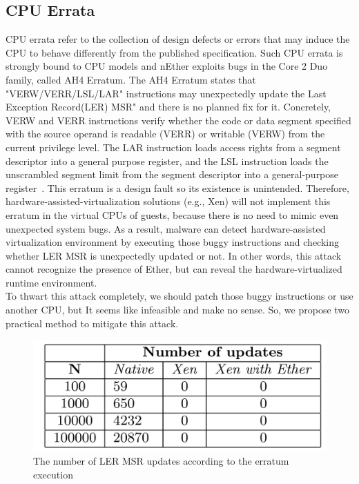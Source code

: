 \subsection{CPU Errata}
\label{sec:approach-errata}
CPU errata refer to the collection of design defects or errors that may induce the CPU to behave differently from the published specification. Such CPU errata is strongly bound to CPU models and nEther exploits bugs in the Core 2 Duo family, called AH4 Erratum. The AH4 Erratum states that "VERW/VERR/LSL/LAR" instructions may unexpectedly update the Last Exception Record(LER) MSR" and there is no planned fix for it. Concretely, VERW and VERR instructions verify whether the code or data segment specified with the source operand is readable (VERR) or writable (VERW) from the current privilege level. The LAR instruction loads access rights from a segment descriptor into a general purpose register, and the LSL instruction loads the unscrambled segment limit from the segment descriptor into a general-purpose register~\cite{intelsys}. This erratum is a design fault so its existence is unintended. Therefore, hardware-assisted-virtualization solutions (e.g., Xen) will not implement this erratum in the virtual CPUs of guests, because there is no need to mimic even unexpected system bugs. As a result, malware can detect hardware-assisted virtualization environment by executing those buggy instructions and checking whether LER MSR is unexpectedly updated or not. In other words, this attack cannot recognize the presence of Ether, but can reveal the hardware-virtualized runtime environment. \\

To thwart this attack completely, we should patch those buggy instructions or use another CPU, but It seems like infeasible and make no sense. So, we propose two practical method to mitigate this attack.

\begin{figure}[!h]
	\centering
	\includegraphics[width=\linewidth]{figure/errata_table.png}
	\caption{The number of LER MSR updates according to the erratum execution}
	\label{fig:errata}
\end{figure}

